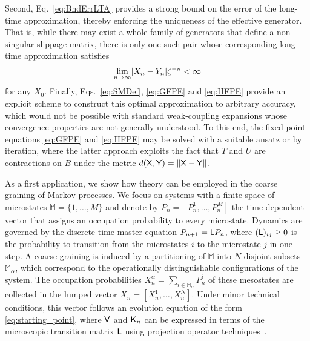 \documentclass[aps,prl,reprint]{revtex4-2}
\begin{document}
Second, Eq.~\eqref{eq:BndErrLTA} provides a strong bound on the error of the long-time approximation, thereby enforcing the uniqueness of the effective generator.
That is, while there may exist a whole family of generators that define a non-singular slippage matrix, there is only one such pair whose corresponding long-time approximation satisfies
\begin{equation}
	\lim_{n\rightarrow\infty} \lvert X_n - Y_n \rvert\zeta^{-n} < \infty
\end{equation}
for any $X_0$.
Finally, Eqs.~\eqref{eq:SMDef}, \eqref{eq:GFPE} and \eqref{eq:HFPE} provide an explicit scheme to construct this optimal approximation to arbitrary accuracy, which would not be possible with standard weak-coupling expansions whose convergence properties are not generally understood.
To this end, the fixed-point equations \eqref{eq:GFPE} and \eqref{eq:HFPE} may be solved with a suitable ansatz or by iteration, where the latter approach exploits the fact that $T$ and $U$ are contractions on $B$ under the metric $d(\mathsf{X},\mathsf{Y})=\lVert \mathsf{X}-\mathsf{Y} \rVert$.

As a first application, we show how theory can be employed in the coarse graining of Markov processes.
We focus on systems with a finite space of microstates $\mathbb{M}=\{1,\dots,M\}$ and denote by $P_n=[P_n^1,\dots,P_n^M]$ the time dependent vector that assigns an occupation probability to every microstate.
Dynamics are governed by the discrete-time master equation
$P_{n+1} = \mathsf{L} P_n$,
where $(\mathsf{L})_{ij}\geq 0$ is the probability to transition from the microstates $i$ to the microstate $j$ in one step.
A coarse graining is induced by a partitioning of $\mathbb{M}$ into $N$ disjoint subsets $\mathbb{M}_\alpha$, which correspond to the operationally distinguishable configurations of the system.
The occupation probabilities $X_n^\alpha = \sum_{i\in\mathbb{M}_\alpha}P^i_n$ of these mesostates are collected in the lumped vector $X_n=[X_n^1,\dots,X_n^N]$.
Under minor technical conditions, this vector follows an evolution equation of the form \eqref{eq:starting_point}, where $\mathsf{V}$ and $\mathsf{K}_n$ can be expressed in terms of the microscopic transition matrix $\mathsf{L}$ using projection operator techniques~\cite{vrugtProjectionOperatorsStatistical2020,
klippensteinIntroducingMemoryCoarseGrained2021,
schillingCoarsegrainedModellingOut2022,
hilderQuantitativeCoarseGrainingMarkov2024}.
\end{document}
